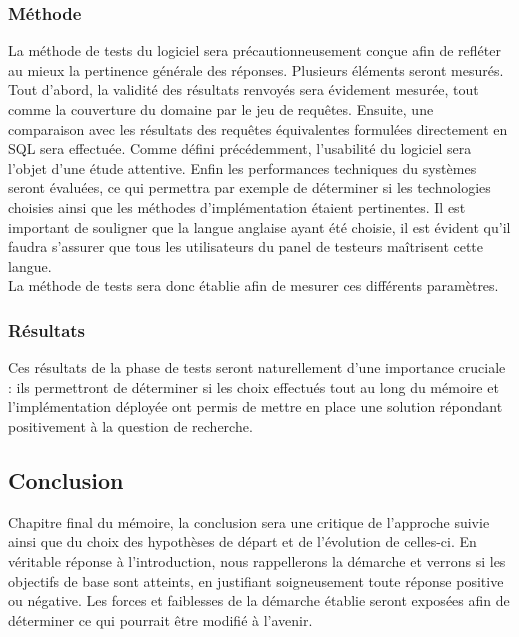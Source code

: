 \documentclass[a4paper,12pt]{article}
\begin{document}
\subsubsection{Méthode}
La méthode de tests du logiciel sera précautionneusement conçue afin de refléter au mieux la pertinence générale des réponses. Plusieurs éléments seront mesurés. Tout d'abord, la validité des résultats renvoyés sera évidement mesurée, tout comme la couverture du domaine par le jeu de requêtes. Ensuite, une comparaison avec les résultats des requêtes équivalentes formulées directement en SQL sera effectuée. Comme défini précédemment, l'usabilité du logiciel sera l'objet d'une étude attentive. Enfin les performances techniques du systèmes seront évaluées, ce qui permettra par exemple de déterminer si les technologies choisies ainsi que les méthodes d'implémentation étaient pertinentes.
Il est important de souligner que la langue anglaise ayant été choisie, il est évident qu'il faudra s'assurer que tous les utilisateurs du panel de testeurs maîtrisent cette langue. \\

La méthode de tests sera donc établie afin de mesurer ces différents paramètres.
\subsubsection{Résultats}
Ces résultats de la phase de tests seront naturellement d'une importance cruciale : ils permettront de déterminer si les choix effectués tout au long du mémoire et l'implémentation déployée ont permis de mettre en place une solution répondant positivement à la question de recherche.
\subsection{Conclusion}
Chapitre final du mémoire, la conclusion sera une critique de l'approche suivie ainsi que du choix des hypothèses de départ et de l'évolution de celles-ci.
En véritable réponse à l'introduction, nous rappellerons la démarche et verrons si les objectifs de base sont atteints, en justifiant soigneusement toute réponse positive ou négative.
Les forces et faiblesses de la démarche établie seront exposées afin de déterminer ce qui pourrait être modifié à l'avenir.
\newpage
\end{document}
